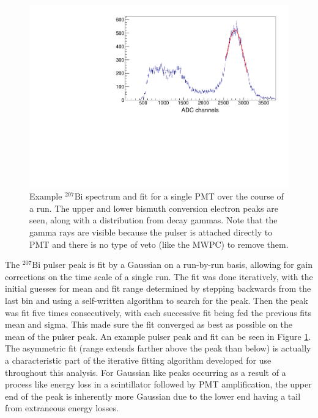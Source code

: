 \begin{figure}[h] 
\centering
\includegraphics[scale=.60]{3-UCNAAnalysis/gain_bismuth2.pdf}
\caption{Example $^{207}\mathrm{Bi}$ spectrum and fit for a single PMT over
  the course of a run. The upper and lower bismuth conversion electron peaks are
  seen, along with a distribution from decay gammas. Note that the gamma rays are
  visible because the pulser is attached directly to PMT and there is no type
  of veto (like the MWPC) to remove them.}
\label{fig:biPulser}
\end{figure}

The $^{207}\mathrm{Bi}$ pulser peak is fit by a Gaussian on a run-by-run basis, allowing for gain corrections on the time
scale of a single run. The fit was done iteratively, with the initial guesses for mean and fit range determined
by stepping backwards from the last bin and using a self-written algorithm to search for the peak. Then the peak
was fit five times consecutively, with each successive fit being fed the previous fits mean and sigma. This
made sure the fit converged as best as possible on the mean of the pulser peak. An example pulser peak and fit
can be seen in Figure \ref{fig:biPulser}. The asymmetric fit (range extends farther above the peak than below)
is actually a characteristic part of the iterative
fitting algorithm developed for use throughout this analysis. For Gaussian like peaks occurring as a result of
a process like energy loss in a scintillator followed by PMT amplification, the upper end of the peak is
inherently more Gaussian due to the lower end having a tail from extraneous energy losses. 


